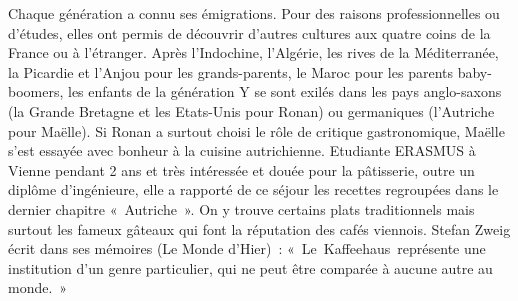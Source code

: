 Chaque génération a connu ses émigrations. Pour des raisons professionnelles ou d’études, elles ont permis de découvrir d’autres cultures aux quatre coins de la France ou à l’étranger. Après l’Indochine, l’Algérie, les rives de la Méditerranée, la Picardie et l’Anjou pour les grands-parents, le Maroc pour les parents baby-boomers, les enfants de la génération Y se sont exilés dans les pays anglo-saxons (la Grande Bretagne et les Etats-Unis pour Ronan) ou germaniques (l’Autriche pour Maëlle).
Si Ronan a surtout choisi le rôle de critique gastronomique, Maëlle s’est essayée avec bonheur à la cuisine autrichienne. Etudiante ERASMUS à Vienne pendant 2 ans et très intéressée et douée pour la pâtisserie, outre un diplôme d’ingénieure, elle a rapporté de ce séjour les recettes regroupées dans le dernier chapitre « Autriche ». On y trouve certains plats traditionnels mais surtout les fameux gâteaux qui font la réputation des cafés viennois. Stefan Zweig écrit dans ses mémoires (Le Monde d’Hier) : « Le Kaffeehaus représente une institution d'un genre particulier, qui ne peut être comparée à aucune autre au monde. »

